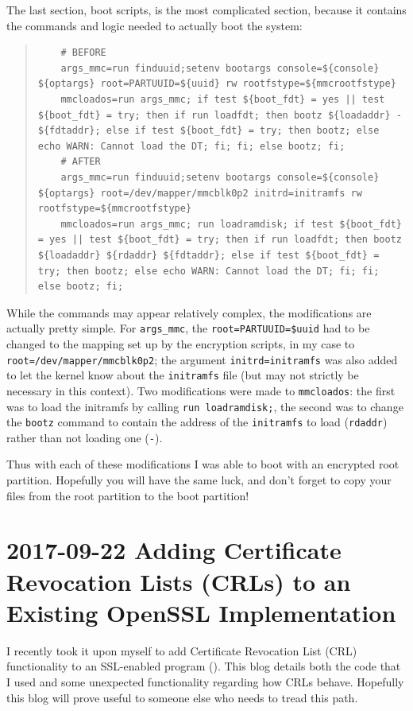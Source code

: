 \documentclass{article}
\begin{document}
The last section, boot scripts, is the most complicated section, because it contains the commands and logic needed to actually boot the system:
\begin{quote}
\begin{verbatim}
	# BEFORE
	args_mmc=run finduuid;setenv bootargs console=${console} ${optargs} root=PARTUUID=${uuid} rw rootfstype=${mmcrootfstype}
	mmcloados=run args_mmc; if test ${boot_fdt} = yes || test ${boot_fdt} = try; then if run loadfdt; then bootz ${loadaddr} - ${fdtaddr}; else if test ${boot_fdt} = try; then bootz; else echo WARN: Cannot load the DT; fi; fi; else bootz; fi;
	# AFTER
	args_mmc=run finduuid;setenv bootargs console=${console} ${optargs} root=/dev/mapper/mmcblk0p2 initrd=initramfs rw rootfstype=${mmcrootfstype}
	mmcloados=run args_mmc; run loadramdisk; if test ${boot_fdt} = yes || test ${boot_fdt} = try; then if run loadfdt; then bootz ${loadaddr} ${rdaddr} ${fdtaddr}; else if test ${boot_fdt} = try; then bootz; else echo WARN: Cannot load the DT; fi; fi; else bootz; fi;
\end{verbatim}
\end{quote}
While the commands may appear relatively complex, the modifications are actually pretty simple.  For \texttt{args_mmc}, the \texttt{root=PARTUUID=\${uuid}} had to be changed to the mapping set up by the encryption scripts, in my case to \texttt{root=/dev/mapper/mmcblk0p2}; the argument \texttt{initrd=initramfs} was also added to let the kernel know about the \texttt{initramfs} file (but may not strictly be necessary in this context).  Two modifications were made to \texttt{mmcloados}: the first was to load the initramfs by calling \texttt{run loadramdisk;}, the second was to change the \texttt{bootz} command to contain the address of the \texttt{initramfs} to load (\texttt{rdaddr}) rather than not loading one (\texttt{-}).

Thus with each of these modifications I was able to boot with an encrypted root partition.  Hopefully you will have the same luck, and don't forget to copy your files from the root partition to the boot partition!


\section{2017-09-22 Adding Certificate Revocation Lists (CRLs) to an Existing OpenSSL Implementation}
I recently took it upon myself to add Certificate Revocation List (CRL) functionality to an SSL-enabled program ().  This blog details both the code that I used and some unexpected functionality regarding how CRLs behave.  Hopefully this blog will prove useful to someone else who needs to tread this path.
\end{document}
